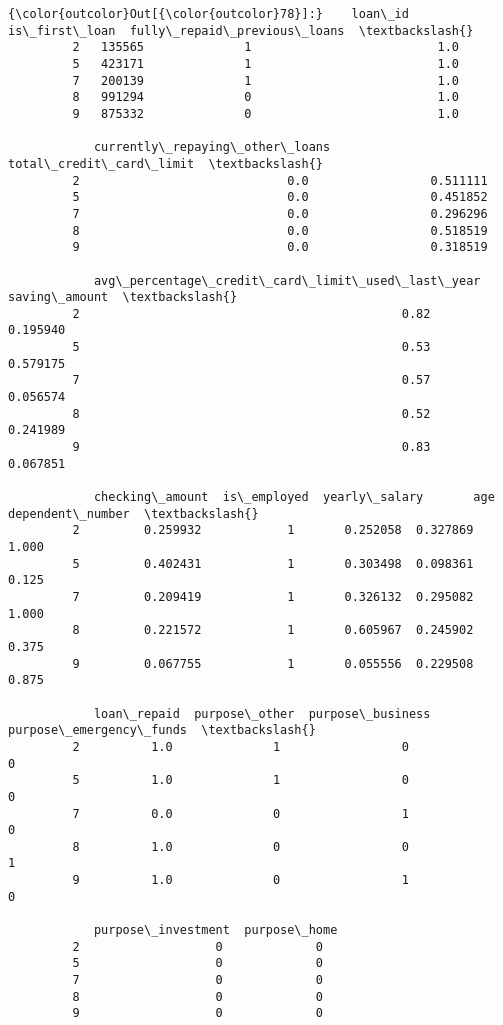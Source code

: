 \documentclass{report}
\begin{document}
            \begin{Verbatim}[commandchars=\\\{\}]
{\color{outcolor}Out[{\color{outcolor}78}]:}    loan\_id  is\_first\_loan  fully\_repaid\_previous\_loans  \textbackslash{}
         2   135565              1                          1.0   
         5   423171              1                          1.0   
         7   200139              1                          1.0   
         8   991294              0                          1.0   
         9   875332              0                          1.0   
         
            currently\_repaying\_other\_loans  total\_credit\_card\_limit  \textbackslash{}
         2                             0.0                 0.511111   
         5                             0.0                 0.451852   
         7                             0.0                 0.296296   
         8                             0.0                 0.518519   
         9                             0.0                 0.318519   
         
            avg\_percentage\_credit\_card\_limit\_used\_last\_year  saving\_amount  \textbackslash{}
         2                                             0.82       0.195940   
         5                                             0.53       0.579175   
         7                                             0.57       0.056574   
         8                                             0.52       0.241989   
         9                                             0.83       0.067851   
         
            checking\_amount  is\_employed  yearly\_salary       age  dependent\_number  \textbackslash{}
         2         0.259932            1       0.252058  0.327869             1.000   
         5         0.402431            1       0.303498  0.098361             0.125   
         7         0.209419            1       0.326132  0.295082             1.000   
         8         0.221572            1       0.605967  0.245902             0.375   
         9         0.067755            1       0.055556  0.229508             0.875   
         
            loan\_repaid  purpose\_other  purpose\_business  purpose\_emergency\_funds  \textbackslash{}
         2          1.0              1                 0                        0   
         5          1.0              1                 0                        0   
         7          0.0              0                 1                        0   
         8          1.0              0                 0                        1   
         9          1.0              0                 1                        0   
         
            purpose\_investment  purpose\_home  
         2                   0             0  
         5                   0             0  
         7                   0             0  
         8                   0             0  
         9                   0             0  
\end{Verbatim}
        
\end{document}

